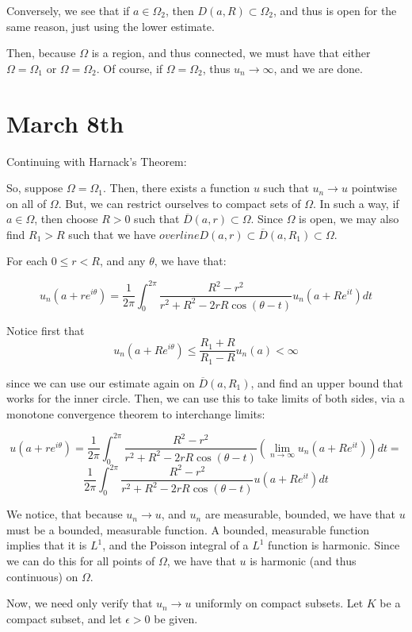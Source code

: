 \documentclass[10pt]{article}
\begin{document}
Conversely, we see that if $a \in \Omega_2$, then $D(a,R) \subset \Omega_2$, and thus is open for the same reason, just using the lower estimate.

Then, because $\Omega$ is a region, and thus connected, we must have that either $\Omega = \Omega_1$ or $\Omega = \Omega_2$. Of course, if $\Omega = \Omega_2$, thus $u_n \to \infty$, and we are done. 

\section*{March 8th} 

Continuing with Harnack’s Theorem:

So, suppose $\Omega = \Omega_1$. Then, there exists a function $u$ such that $u_n \to u$ pointwise on all of $\Omega$. But, we can restrict ourselves to compact sets of $\Omega$. In such a way, if $a \in \Omega$, then choose $R> 0$ such that $\overline{D}(a,r) \subset \Omega$. Since $\Omega$ is open, we may also find $R_1 > R$ such that we have $overline{D}(a,r) \subset \overline{D}(a,R_1) \subset \Omega$.

For each $0 \leq r < R$, and any $\theta$, we have that:

$$u_n(a + re^{i\theta}) = \frac{1}{2\pi} \int_0^{2\pi}  \frac{R^2 - r^2}{r^2 + R^2 - 2rR \cos(\theta - t)} u_n(a + Re^{it}) dt$$

Notice first that $$ u_n(a + Re^{i\theta}) \leq \frac{R_1 + R}{R_1 - R} u_n(a) < \infty $$

since we can use our estimate again on $\overline{D}(a,R_1)$, and find an upper bound that works for the inner circle. Then, we can use this to take limits of both sides, via a monotone convergence theorem to interchange limits:

$$ u(a + re^{i\theta}) = \frac{1}{2\pi} \int_0^{2\pi}  \frac{R^2 - r^2}{r^2 + R^2 - 2rR \cos(\theta - t)} \left( \lim_{n\to\infty}u_n(a + Re^{it})\right) dt =$$ $$ \frac{1}{2\pi} \int_0^{2\pi}  \frac{R^2 - r^2}{r^2 + R^2 - 2rR \cos(\theta - t)} u(a + Re^{it})dt$$

We notice, that because $u_n \to u$, and $u_n$ are measurable, bounded, we have that $u$ must be a bounded, measurable function. A bounded, measurable function implies that it is $L^1$, and the Poisson integral of a $L^1$ function is harmonic. Since we can do this for all points of $\Omega$, we have that $u$ is harmonic (and thus continuous) on $\Omega$. 

Now, we need only verify that $u_n \to u$ uniformly on compact subsets. Let $K$ be a compact subset, and let $\epsilon > 0$ be given. 
\end{document}
